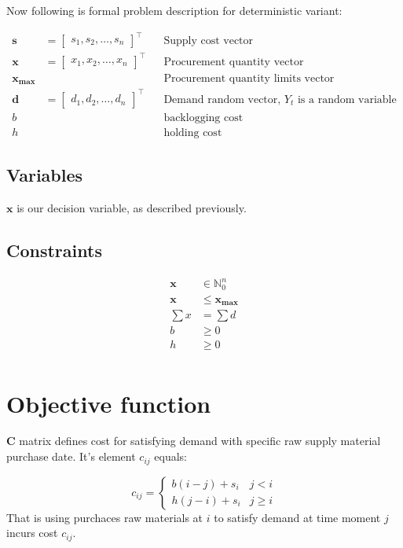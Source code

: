 Now following is formal problem description for deterministic variant:

\begin{align*}
    \mathbf{s} &= \begin{bmatrix}
        s_1, s_2, \dotsc, s_n
    \end{bmatrix}^\intercal && \text{Supply cost vector} \\
    \mathbf{x} &= \begin{bmatrix}
        x_1, x_2, \dotsc, x_n
    \end{bmatrix}^\intercal && \text{Procurement quantity vector} \\
    \mathbf{x_{\max}}  & && \text{Procurement quantity limits vector} \\
    \mathbf{d} &= \begin{bmatrix}
        d_1, d_2, \dotsc, d_n
    \end{bmatrix}^\intercal && \text{Demand random vector, $Y_t$ is a random variable} \\
    b & && \text{backlogging cost} \\
    h & && \text{holding cost}
\end{align*}

\subsection{Variables}
\label{sub:Variables}
$\mathbf{x}$ is our decision variable, as described previously.
\subsection{Constraints}
\label{sub:Constraints}
\begin{align*}
    \mathbf{x} &\in \mathbb{N}_0^n \\
    \mathbf{x} &\le \mathbf{x_{\text{max}}}\\
    \sum{x} &= \sum{d} \\
    b &\ge 0\\
    h &\ge 0\\
\end{align*}

\section{Objective function}

\begin{definition}{$\mathbf{C}$}
matrix defines cost for satisfying demand with specific raw supply material purchase date. It's element $c_{ij}$ equals:

\begin{equation*}
    c_{ij} = \begin{cases}
        b \left( i - j \right) + s_i & j < i \\
        h \left( j - i \right) + s_i & j \ge i
    \end{cases}
\end{equation*}
That is using purchaces raw materials at $i$ to satisfy demand at time moment $j$ incurs cost $c_{ij}$.
\end{definition}


